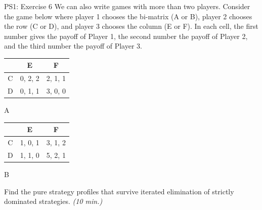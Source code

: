 \begin{frame}{PS1: Exercise 6}
  We can also write games with more than two players. Consider the game below where
  player 1 chooses the bi-matrix (A or B), player 2 chooses the row (C or D), and player 3
  chooses the column (E or F). In each cell, the first number gives the payoff of Player 1,
  the second number the payoff of Player 2, and the third number the payoff of Player 3.
\begin{multicols}{2}
\begin{table}
  \begin{tabular}{c|c|c}
      & E       & F       \\
    \midrule
    C & 0, 2, 2 & 2, 1, 1 \\
    \midrule
    D & 0, 1, 1 & 3, 0, 0
  \end{tabular}
  \center A
\end{table}
\vfill\null \columnbreak
\begin{table}
  \begin{tabular}{c|c|c}
      & E       & F       \\
    \midrule
    C & 1, 0, 1 & 3, 1, 2 \\
    \midrule
    D & 1, 1, 0 & 5, 2, 1
  \end{tabular}
  \center B
\end{table}
\vfill\null
\end{multicols}
Find the pure strategy profiles that survive iterated elimination of strictly dominated strategies. \textit{(10 min.)}
\end{frame}

